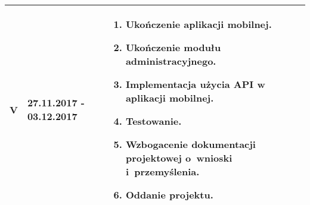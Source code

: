 \begin{tabularx}{\textwidth}{|p{1cm}|p{4cm}|p{9.68cm}|}
	\hline
	V & 27.11.2017 - 03.12.2017 &
	\begin{enumerate}
		\item Ukończenie aplikacji mobilnej.
		\item Ukończenie modułu administracyjnego.
		\item Implementacja użycia API w aplikacji mobilnej.
		\item Testowanie.
		\item Wzbogacenie dokumentacji projektowej o~wnioski i~przemyślenia.
		\item Oddanie projektu.
	\end{enumerate}
	\tabularnewline \hline
\end{tabularx}
